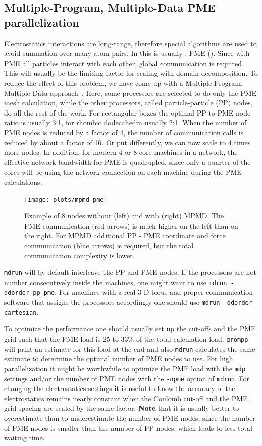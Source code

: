 \subsection{Multiple-Program, Multiple-Data PME parallelization}
\label{subsec:mpmd_pme}
Electrostatics interactions are long-range, therefore special
algorithms are used to avoid summation over many atom pairs.
In {\gromacs} this is usually
{.}
{PME ().}
Since with PME all particles interact with each other, global communication
is required. This will usually be the limiting factor for 
scaling with domain decomposition.
To reduce the effect of this problem, we have come up with
a Multiple-Program, Multiple-Data approach~\cite{Hess2008b}.
Here, some processors are selected to do only the PME mesh calculation,
while the other processors, called particle-particle (PP) nodes,
do all the rest of the work.
For rectangular boxes the optimal PP to PME node ratio is usually 3:1,
for rhombic dodecahedra usually 2:1.
When the number of PME nodes is reduced by a factor of 4, the number
of communication calls is reduced by about a factor of 16.
Or put differently, we can now scale to 4 times more nodes.
In addition, for modern 4 or 8 core machines in a network,
the effective network bandwidth for PME is quadrupled,
since only a quarter of the cores will be using the network connection
on each machine during the PME calculations.

\begin{figure}
\centerline{\texttt{[image: plots/mpmd-pme]}}
\caption{
Example of 8 nodes without (left) and with (right) MPMD.
The PME communication (red arrows) is much higher on the left
than on the right. For MPMD additional PP - PME coordinate
and force communication (blue arrows) is required,
but the total communication complexity is lower.
\label{fig:mpmd_pme}
}
\end{figure}

{\tt mdrun} will by default interleave the PP and PME nodes.
If the processors are not number consecutively inside the machines,
one might want to use {\tt mdrun -ddorder pp_pme}.
For machines with a real 3-D torus and proper communication software
that assigns the processors accordingly one should use
{\tt mdrun -ddorder cartesian}.

To optimize the performance one should usually set up the cut-offs
and the PME grid such that the PME load is 25 to 33\% of the total
calculation load. {\tt grompp} will print an estimate for this load
at the end and also {\tt mdrun} calculates the same estimate
to determine the optimal number of PME nodes to use.
For high parallelization it might be worthwhile to optimize
the PME load with the {\tt mdp} settings and/or the number
of PME nodes with the {\tt -npme} option of {\tt mdrun}.
For changing the electrostatics settings it is useful to know
the accuracy of the electrostatics remains nearly constant
when the Coulomb cut-off and the PME grid spacing are scaled
by the same factor.
{\bf Note} that it is usually better to overestimate than to underestimate
the number of PME nodes, since the number of PME nodes is smaller
than the number of PP nodes, which leads to less total waiting time.

